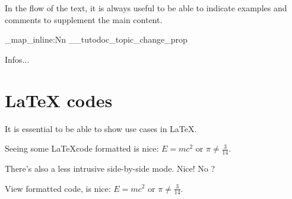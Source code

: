 \documentclass[theme = color]{tutodoc}
\newcommand\myexrmktext{
    In the flow of the text, it is always useful to be able to indicate examples and comments to supplement the main content.
}
\begin{document}
\myexrmktext

\ExplSyntaxOn

\prop_map_inline:Nn \g__tutodoc_topic_change_prop {
    \begin{tdoc#1}
        \item Infos...
    \end{tdoc#1}
}

\ExplSyntaxOff


\section{LaTeX codes}

It is essential to be able to show use cases in \LaTeX.

\begin{tdoclatex}
Seeing some \LaTeX code formatted is nice: $E = m c^2$ or $\pi \neq \frac{3}{14}$.
\end{tdoclatex}


There's also a less intrusive side-by-side mode. Nice! No ?

\begin{tdoclatex}[sbs]
View formatted code,
is nice: $E = m c^2$ or
$\pi \neq \frac{3}{14}$.
\end{tdoclatex}
\end{document}
